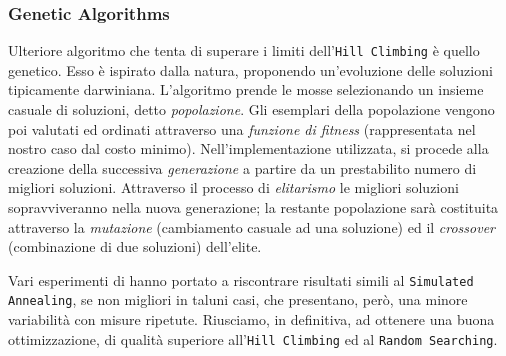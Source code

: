 			\subsubsection{Genetic Algorithms}
				Ulteriore algoritmo che tenta di superare i limiti dell'\texttt{Hill Climbing} è quello genetico. Esso è ispirato dalla natura, proponendo un'evoluzione delle soluzioni tipicamente darwiniana. L'algoritmo prende le mosse selezionando un insieme casuale di soluzioni, detto \emph{popolazione}. Gli esemplari della popolazione vengono poi valutati ed ordinati attraverso una \emph{funzione di fitness} (rappresentata nel nostro caso dal costo minimo). Nell'implementazione utilizzata, si procede alla creazione della successiva \emph{generazione} a partire da un prestabilito numero di migliori soluzioni. Attraverso il processo di \emph{elitarismo} le migliori soluzioni sopravviveranno nella nuova generazione; la restante popolazione sarà costituita attraverso la \emph{mutazione} (cambiamento casuale ad una soluzione) ed il \emph{crossover} (combinazione di due soluzioni) dell'elite.\par
				Vari esperimenti di hanno portato a riscontrare risultati simili  al \texttt{Simulated Annealing}, se non migliori in taluni casi, che presentano, però, una minore variabilità con misure ripetute. Riusciamo, in definitiva, ad ottenere una buona ottimizzazione, di qualità superiore all'\texttt{Hill Climbing} ed al \texttt{Random Searching}.
